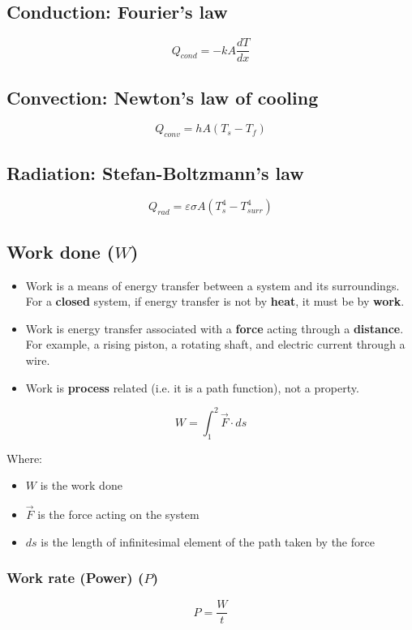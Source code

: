 \documentclass[11pt]{article}
\begin{document}
\subsection{Conduction: Fourier's law}
\label{sec:orgc9b12e8}
\[Q_{cond} = -kA \frac{dT}{dx}\]

\subsection{Convection: Newton's law of cooling}
\label{sec:org2ba0015}
\[Q_{conv} = hA(T_s - T_f)\]

\subsection{Radiation: Stefan-Boltzmann's law}
\label{sec:org39d01c5}
\[Q_{rad} = \varepsilon \sigma A(T_s^4 - T_{surr}^4)\]

\newpage

\subsection{Work done (\(W\))}
\label{sec:orgb84cd37}
\begin{itemize}
\item Work is a means of energy transfer between a system and its surroundings. For a \textbf{closed} system, if energy transfer is not by \textbf{heat}, it must be by \textbf{work}.
\item Work is energy transfer associated with a \textbf{force} acting through a \textbf{distance}. For example, a rising piston, a rotating shaft, and electric current through a wire.
\item Work is \textbf{process} related (i.e. it is a path function), not a property.
\end{itemize}

\[W = \int_1^2 \vec{F} \cdot ds\]

Where:
\begin{itemize}
\item \(W\) is the work done
\item \(\vec{F}\) is the force acting on the system
\item \(ds\) is the length of infinitesimal element of the path taken by the force
\end{itemize}

\subsubsection{Work rate (Power) (\(P\))}
\label{sec:orge75ec9c}
\[P = \frac{W}{t}\]
\end{document}
